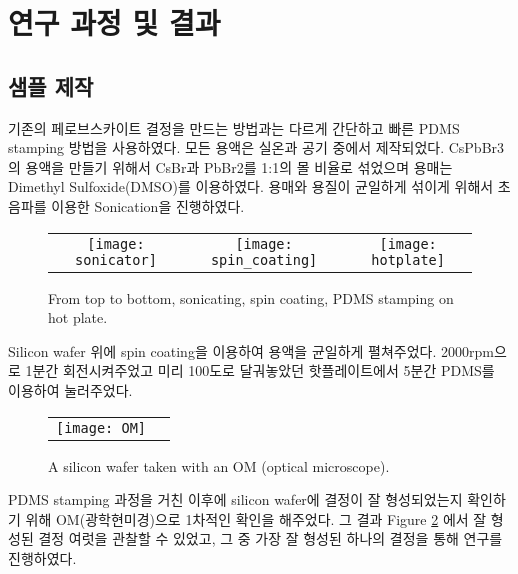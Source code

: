\section{연구 과정 및 결과}

\subsection{샘플 제작}
기존의 페로브스카이트 결정을 만드는 방법과는 다르게 간단하고 빠른 PDMS stamping 방법을 사용하였다.
모든 용액은 실온과 공기 중에서 제작되었다. CsPbBr3의 용액을 만들기 위해서 CsBr과 PbBr2를 1:1의 몰 비율로 섞었으며 용매는 Dimethyl Sulfoxide(DMSO)를 이용하였다. 용매와 용질이 균일하게 섞이게 위해서 초음파를 이용한 Sonication을 진행하였다.
\begin{figure}[H]
	\begin{center}
		\begin{tabular}{ccc}
			\texttt{[image: sonicator]}&
			\texttt{[image: spin\_coating]}&
			\texttt{[image: hotplate]}
		\end{tabular}
	\end{center}
	\caption{From top to bottom, sonicating, spin coating, PDMS stamping on hot plate.}
	\label{fig:sample}  
\end{figure}


Silicon wafer 위에 spin coating을 이용하여 용액을 균일하게 펼쳐주었다. 2000rpm으로 1분간 회전시켜주었고 미리 100도로 달궈놓았던 핫플레이트에서 5분간 PDMS를 이용하여 눌러주었다.
\begin{figure}[H]
	\begin{center}
		\begin{tabular}{cc}
			\texttt{[image: OM]}
		\end{tabular}
	\end{center}
	\caption{A silicon wafer taken with an OM (optical microscope).}
	\label{fig:om}  
\end{figure}
PDMS stamping 과정을 거친 이후에 silicon wafer에 결정이 잘 형성되었는지 확인하기 위해 OM(광학현미경)으로 1차적인 확인을 해주었다. 그 결과 Figure \ref{fig:om} 에서 잘 형성된 결정 여럿을 관찰할 수 있었고, 그 중 가장 잘 형성된 하나의 결정을 통해 연구를 진행하였다.


